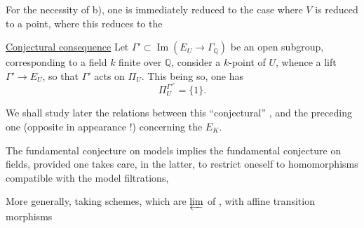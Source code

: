 For the necessity of b), one is immediately reduced to the case where $V$ is reduced to a point, where this reduces to the 

\uline{Conjectural consequence} Let $\Gamma'\subset\operatorname{Im}(E_U\longrightarrow\Gamma_{\mathbb{Q}})$ be an open subgroup, corresponding to a field $k$ finite over $\mathbb{Q}$, consider a $k$-point of $U$, whence a lift $\Gamma'\longrightarrow E_U$, so that $\Gamma'$ acts on $\Pi_U$. This being so, one has
\[
\Pi_U^{\Gamma'^\circ}=\{1\}.
\]

We shall study later the relations between this ``conjectural'' , and the preceding one (opposite in appearance !) concerning the $E_K$.

The fundamental conjecture on models implies the fundamental conjecture on fields, provided one takes care, in the latter, to restrict oneself to homomorphisms compatible with the model filtrations,

More generally, taking  schemes,  which are $\varprojlim$ of   , with affine transition morphisms 

